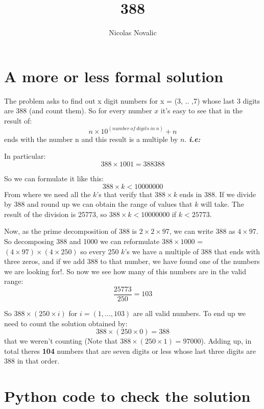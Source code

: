 \documentclass{article}
\begin{document}
\title{%
		\LARGE \textbf{388} \\
        }
\author{
	Nicolas Novalic
}

\section*{A more or less formal solution}

The problem asks to find out x digit numbers for x = (3, .. ,7) whose last 3 digits are 388 (and count them).
\vskip 0.2in
So for every number $x$ it's easy to see that in the result of: $$n \times 10^{(number \ of \ digits \ in \ n)} + n$$ \vskip 0.0in ends with the number n and this result is a multiple by $n$.
\vskip 0.2in
\textbf{\textit{i.e:}} \\

\noindent{}\vskip 0.2in

In particular: $$388 \times 1001 = 388388$$

\vskip 0.2in
So we can formulate it like this:
$$ 388 \times k < 10000000 $$
\vskip 0.2in
From where we need all the $k$'s that verify that $388 \times k$ ends in 388.
\vskip 0.2in
If we divide by 388 and round up we can obtain the range of values that $k$ will take. The result of the division is 25773, so $388 \times k < 10000000$ if $k < 25773$.

\vskip 0.2in
Now, as the prime decomposition of 388 is $2 \times 2 \times 97$, we can write 388 as $4 \times 97$.
\vskip 0.2in
So decomposing 388 and 1000 we can reformulate $388 \times 1000$ = $(4 \times 97) \times (4 \times 250)$ so every 250 $k$'s we have a multiple of 388 that ends with three zeros, and if we add 388 to that number, we have found one of the numbers we are looking for!.
\vskip 0.2in
So now we see how many of this numbers are in the valid range:
$$\frac{25773}{250} = 103$$

So $388 \times (250 \times i)$ for $i = (1, ... , 103)$ are all valid numbers.
\vskip 0.2in
To end up we need to count the solution obtained by: $$388 \times (250 \times 0) = 388$$ \vskip 0.0in that we weren't counting (Note that $388 \times (250 \times 1) = 97000$).
\vskip 0.2in
Adding up, in total theres \textbf{104} numbers that are seven digits or less whose last three digits are 388 in that order. 

\section*{Python code to check the solution}
\end{document}

